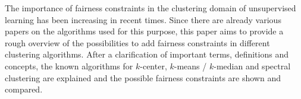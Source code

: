 The importance of fairness constraints in the clustering domain of unsupervised learning has been increasing in recent times. Since there are already various papers on the algorithms used for this purpose, this paper aims to provide a rough overview of the possibilities to add fairness constraints in different clustering algorithms. After a clarification of important terms, definitions and concepts, the known algorithms for $k$-center, $k$-means / $k$-median and spectral clustering are explained and the possible fairness constraints are shown and compared.